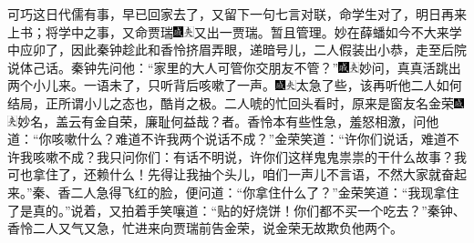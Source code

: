 可巧这日代儒有事，早已回家去了，又留下一句七言对联，命学生对了，明日再来上书；将学中之事，又命贾瑞{\includegraphics[width=3mm]{../Images/00005}\includegraphics[width=3mm]{../Images/00012}\footnotesize \kaishu 又出一贾瑞。}暂且管理。妙在薛蟠如今不大来学中应卯了，因此秦钟趁此和香怜挤眉弄眼，递暗号儿，二人假装出小恭，走至后院说体己话。秦钟先问他：``家里的大人可管你交朋友不管？''{\includegraphics[width=3mm]{../Images/00005}\includegraphics[width=3mm]{../Images/00012}\footnotesize \kaishu 妙问，真真活跳出两个小儿来。}一语未了，只听背后咳嗽了一声。{\includegraphics[width=3mm]{../Images/00005}\includegraphics[width=3mm]{../Images/00012}\footnotesize \kaishu 太急了些，该再听他二人如何结局，正所谓小儿之态也，酷肖之极。}二人唬的忙回头看时，原来是窗友名金荣{\includegraphics[width=3mm]{../Images/00005}\includegraphics[width=3mm]{../Images/00012}\footnotesize \kaishu 妙名，盖云有金自荣，廉耻何益哉？}者。香怜本有些性急，羞怒相激，问他道：``你咳嗽什么？难道不许我两个说话不成？''金荣笑道：``许你们说话，难道不许我咳嗽不成？我只问你们：有话不明说，许你们这样鬼鬼祟祟的干什么故事？我可也拿住了，还赖什么！先得让我抽个头儿，咱们一声儿不言语，不然大家就奋起来。''秦、香二人急得飞红的脸，便问道：``你拿住什么了？''金荣笑道：``我现拿住了是真的。''说着，又拍着手笑嚷道：``贴的好烧饼！你们都不买一个吃去？''秦钟、香怜二人又气又急，忙进来向贾瑞前告金荣，说金荣无故欺负他两个。

